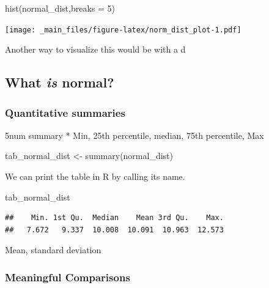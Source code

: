 \documentclass[
]{book}
\newenvironment{Shaded}{\begin{snugshade}}{\end{snugshade}}
\newcommand{\AttributeTok}[1]{\textcolor[rgb]{0.77,0.63,0.00}{#1}}
\newcommand{\DecValTok}[1]{\textcolor[rgb]{0.00,0.00,0.81}{#1}}
\newcommand{\FunctionTok}[1]{\textcolor[rgb]{0.00,0.00,0.00}{#1}}
\newcommand{\NormalTok}[1]{#1}
\newcommand{\OtherTok}[1]{\textcolor[rgb]{0.56,0.35,0.01}{#1}}
\begin{document}
\begin{Shaded}
\begin{Highlighting}[]
\FunctionTok{hist}\NormalTok{(normal\_dist,}\AttributeTok{breaks =} \DecValTok{5}\NormalTok{)}
\end{Highlighting}
\end{Shaded}

\texttt{[image: \_main\_files/figure-latex/norm\_dist\_plot-1.pdf]}

Another way to visualize this would be with a d

\hypertarget{what-is-normal}{%
\subsection{\texorpdfstring{What \emph{is} normal?}{What is normal?}}\label{what-is-normal}}

\hypertarget{quantitative-summaries}{%
\subsubsection{Quantitative summaries}\label{quantitative-summaries}}

5num summary
* Min, 25th percentile, median, 75th percentile, Max

\begin{Shaded}
\begin{Highlighting}[]
\NormalTok{tab\_normal\_dist }\OtherTok{\textless{}{-}} \FunctionTok{summary}\NormalTok{(normal\_dist)}
\end{Highlighting}
\end{Shaded}

We can print the table in R by calling its name.

\begin{Shaded}
\begin{Highlighting}[]
\NormalTok{tab\_normal\_dist}
\end{Highlighting}
\end{Shaded}

\begin{verbatim}
##    Min. 1st Qu.  Median    Mean 3rd Qu.    Max. 
##   7.672   9.337  10.008  10.091  10.963  12.573
\end{verbatim}

Mean, standard deviation

\hypertarget{meaningful-comparisons}{%
\subsubsection{Meaningful Comparisons}\label{meaningful-comparisons}}
\end{document}
